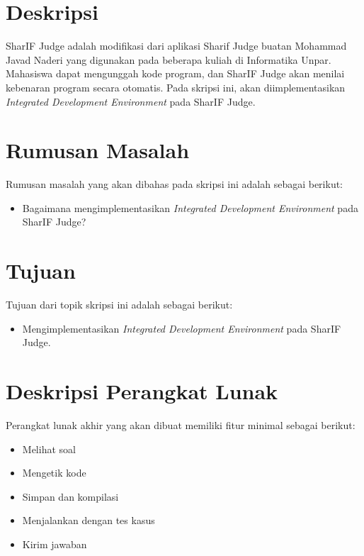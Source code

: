\documentclass[a4paper,twoside]{article}
\begin{document}
\title{\@judultopik}
\author{\nama \textendash \@npm} 

\newcommand{\nama}{Nicholas Aditya Halim}
\newcommand{\@npm}{2017730018}
\newcommand{\@judultopik}{Implementasi Editor Kode pada SharIF Judge} %
\newcommand{\jumpemb}{1} %
\newcommand{\tanggal}{01/01/1900}


\maketitle


\section{Deskripsi}
SharIF Judge adalah modifikasi dari aplikasi Sharif Judge buatan Mohammad Javad Naderi yang digunakan pada beberapa kuliah di Informatika Unpar. Mahasiswa dapat mengunggah kode program, dan SharIF Judge akan menilai kebenaran program secara otomatis. Pada skripsi ini, akan diimplementasikan {\it Integrated Development Environment} pada SharIF Judge.

\section{Rumusan Masalah}
Rumusan masalah yang akan dibahas pada skripsi ini adalah sebagai berikut:
\begin{itemize}
	\item Bagaimana mengimplementasikan {\it Integrated Development Environment} pada SharIF Judge?
\end{itemize}


\section{Tujuan}
Tujuan dari topik skripsi ini adalah sebagai berikut:
\begin{itemize}
	\item Mengimplementasikan {\it Integrated Development Environment} pada SharIF Judge.
\end{itemize}

\section{Deskripsi Perangkat Lunak}
Perangkat lunak akhir yang akan dibuat memiliki fitur minimal sebagai berikut:
\begin{itemize}
	\item Melihat soal
	\item Mengetik kode
	\item Simpan dan kompilasi
	\item Menjalankan dengan tes kasus
	\item Kirim jawaban
\end{itemize}
\end{document}
